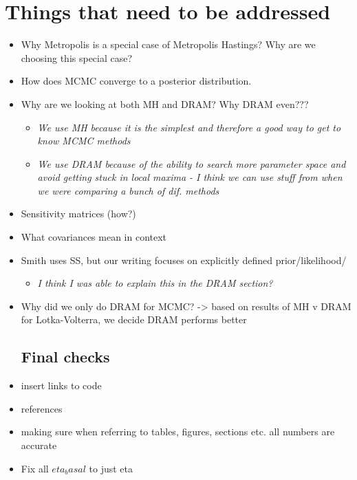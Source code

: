 \documentclass{article}
\begin{document}
\section{Things that need to be addressed}
\begin{itemize}
    \item Why Metropolis is a special case of Metropolis Hastings? Why are we choosing this special case?
    \item How does MCMC converge to a posterior distribution.
    \item Why are we looking at both MH and DRAM? Why DRAM even???
    \begin{itemize}
        \item \emph{We use MH because it is the simplest and therefore a good way to get to know MCMC methods}
        \item \emph{We use DRAM because of the ability to search more parameter space and avoid getting stuck in local maxima - I think we can use stuff from when we were comparing a bunch of dif. methods}
    \end{itemize}
    \item Sensitivity matrices (how?)
    \item What covariances mean in context
    \item Smith uses SS, but our writing focuses on explicitly defined prior/likelihood/
    \begin{itemize}
        \item \textit{I think I was able to explain this in the DRAM section?}
    \end{itemize}
    \item Why did we only do DRAM for MCMC? -> based on results of MH v DRAM for Lotka-Volterra, we decide DRAM performs better
    \subsection{Final checks}
    \item insert links to code 
    \item references
    \item making sure when referring to tables, figures, sections etc. all numbers are accurate
    \item Fix all $eta_basal$ to just eta
\end{itemize}
\end{document}
